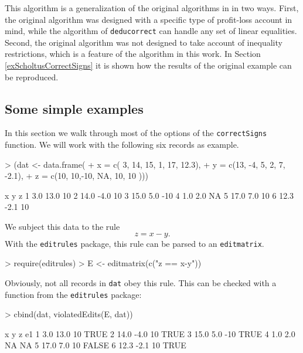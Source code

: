 \documentclass[11pt, fleqn, a4paper]{article}
\begin{document}
This algorithm is a generalization of the original algorithms in
\cite{scholtus:2008} in two ways. First, the original algorithm was designed
with a specific type of profit-loss account in mind, while the algorithm of
{\tt deducorrect} can handle any set of linear equalities. Second, the original
algorithm was not designed to take account of inequality restrictions, which is
a feature of the algorithm in this work. In Section
\ref{exScholtusCorrectSigns} it is shown how the results of the original
example can be reproduced.



%
%
\subsection{Some simple examples}
In this section we walk through most of the options of the {\tt correctSigns}
function.  We will work with the following six records as example.
\begin{Schunk}
\begin{Sinput}
> (dat <- data.frame(
+     x = c( 3, 14, 15,  1, 17, 12.3),
+     y = c(13, -4,  5,  2,  7, -2.1),
+     z = c(10, 10,-10, NA, 10, 10 )))
\end{Sinput}
\begin{Soutput}
     x    y   z
1  3.0 13.0  10
2 14.0 -4.0  10
3 15.0  5.0 -10
4  1.0  2.0  NA
5 17.0  7.0  10
6 12.3 -2.1  10
\end{Soutput}
\end{Schunk}
We subject this data to the rule
\begin{equation}
z = x-y.
\end{equation}
With the {\tt editrules} package, this rule can be parsed to an {\tt editmatrix}.
\begin{Schunk}
\begin{Sinput}
> require(editrules)
> E <- editmatrix(c("z == x-y"))
\end{Sinput}
\end{Schunk}
Obviously, not all records in {\tt dat} obey this rule. This can be checked with 
a function from the {\tt editrules} package:
\begin{Schunk}
\begin{Sinput}
> cbind(dat, violatedEdits(E, dat))
\end{Sinput}
\begin{Soutput}
     x    y   z    e1
1  3.0 13.0  10  TRUE
2 14.0 -4.0  10  TRUE
3 15.0  5.0 -10  TRUE
4  1.0  2.0  NA    NA
5 17.0  7.0  10 FALSE
6 12.3 -2.1  10  TRUE
\end{Soutput}
\end{Schunk}
\end{document}

